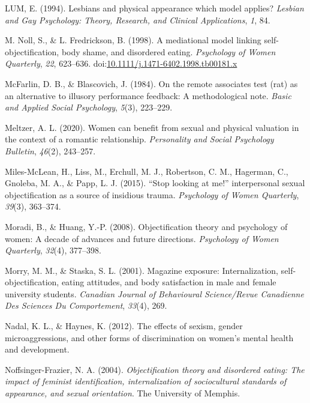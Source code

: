 \documentclass[man]{apa6}
\begin{document}
\hypertarget{ref-lum1994lesbians}{}
LUM, E. (1994). Lesbians and physical appearance which model applies?
\emph{Lesbian and Gay Psychology: Theory, Research, and Clinical
Applications}, \emph{1}, 84.

\hypertarget{ref-nollfredrickson1998}{}
M. Noll, S., \& L. Fredrickson, B. (1998). A mediational model linking
self-objectification, body shame, and disordered eating.
\emph{Psychology of Women Quarterly}, \emph{22}, 623--636.
doi:\href{https://doi.org/10.1111/j.1471-6402.1998.tb00181.x}{10.1111/j.1471-6402.1998.tb00181.x}

\hypertarget{ref-mcfarlin1984remote}{}
McFarlin, D. B., \& Blascovich, J. (1984). On the remote associates test
(rat) as an alternative to illusory performance feedback: A
methodological note. \emph{Basic and Applied Social Psychology},
\emph{5}(3), 223--229.

\hypertarget{ref-meltzer2020women}{}
Meltzer, A. L. (2020). Women can benefit from sexual and physical
valuation in the context of a romantic relationship. \emph{Personality
and Social Psychology Bulletin}, \emph{46}(2), 243--257.

\hypertarget{ref-miles2015stop}{}
Miles-McLean, H., Liss, M., Erchull, M. J., Robertson, C. M., Hagerman,
C., Gnoleba, M. A., \& Papp, L. J. (2015). ``Stop looking at me!''
interpersonal sexual objectification as a source of insidious trauma.
\emph{Psychology of Women Quarterly}, \emph{39}(3), 363--374.

\hypertarget{ref-moradi2008}{}
Moradi, B., \& Huang, Y.-P. (2008). Objectification theory and
psychology of women: A decade of advances and future directions.
\emph{Psychology of Women Quarterly}, \emph{32}(4), 377--398.

\hypertarget{ref-morry2001magazine}{}
Morry, M. M., \& Staska, S. L. (2001). Magazine exposure:
Internalization, self-objectification, eating attitudes, and body
satisfaction in male and female university students. \emph{Canadian
Journal of Behavioural Science/Revue Canadienne Des Sciences Du
Comportement}, \emph{33}(4), 269.

\hypertarget{ref-nadal2012effects}{}
Nadal, K. L., \& Haynes, K. (2012). The effects of sexism, gender
microaggressions, and other forms of discrimination on women's mental
health and development.

\hypertarget{ref-noffsinger2004objectification}{}
Noffsinger-Frazier, N. A. (2004). \emph{Objectification theory and
disordered eating: The impact of feminist identification,
internalization of sociocultural standards of appearance, and sexual
orientation}. The University of Memphis.
\end{document}
